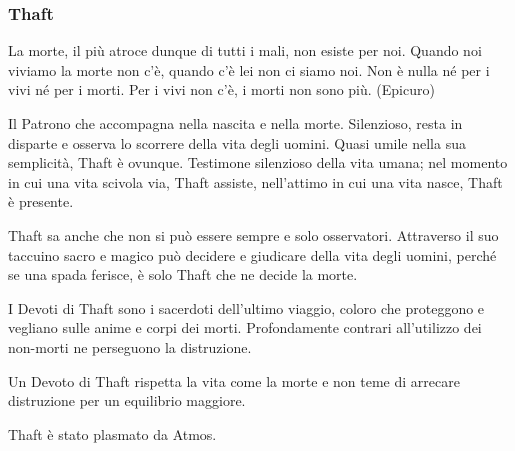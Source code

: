 \begin{multicols}{2}
\subsubsection{Thaft}\label{thaft}\hypertarget{thaft}{}


\begin{changemargin}{0.3cm}{0.3cm}\begin{enfasi}{
La morte, il più atroce dunque di tutti i mali, non esiste per noi. Quando noi viviamo la morte non c'è, quando c'è lei non ci siamo noi. Non è nulla né per i vivi né per i morti. Per i vivi non c'è, i morti non sono più. (Epicuro)
}\end{enfasi}\end{changemargin}\medskip

Il Patrono che accompagna nella nascita e nella morte. Silenzioso, resta in disparte e osserva lo scorrere della vita degli uomini. Quasi umile nella sua semplicità, Thaft è ovunque. Testimone silenzioso della vita umana; nel momento in cui una vita scivola via, Thaft assiste, nell'attimo in cui una vita nasce, Thaft è presente.

Thaft sa anche che non si può essere sempre e solo osservatori. Attraverso il suo taccuino sacro e magico può decidere e giudicare della vita degli uomini, perché se una spada ferisce, è solo Thaft che ne decide la morte.

I Devoti di Thaft sono i sacerdoti dell'ultimo viaggio, coloro che proteggono e vegliano sulle anime e corpi dei morti. Profondamente contrari all'utilizzo dei non-morti ne perseguono la distruzione.

Un Devoto di Thaft rispetta la vita come la morte e non teme di arrecare distruzione per un equilibrio maggiore.

Thaft è stato plasmato da Atmos.


\end{multicols}
